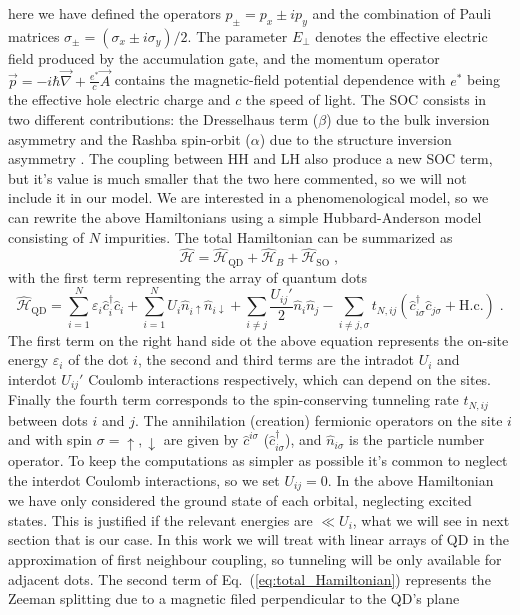 here we have defined the operators $p_\pm=p_x\pm ip_y$ and the combination of Pauli matrices $\sigma_{\pm}=(\sigma_x\pm i\sigma_y)/2$. The parameter $E_\perp$ denotes the effective electric field produced by the accumulation gate, and the momentum operator $\vec{p}=-i\hbar\vec{\nabla}+\frac{e^*}{c}\vec{A}$ contains the magnetic-field potential dependence with $e^*$ being the effective hole electric charge and $c$ the speed of light. The SOC consists in two different contributions: the Dresselhaus term ($\beta$) due to the bulk inversion asymmetry \cite{Dresselhaus1955} and the Rashba spin-orbit ($\alpha$) due to the structure inversion asymmetry \cite{Bychkov1984}. The coupling between HH and LH also produce a new SOC term\cite{Bulaev2007}, but it's value is much smaller that the two here commented, so we will not include it in our model. We are interested in a phenomenological model, so we can rewrite the above Hamiltonians using a simple Hubbard-Anderson \cite{1963a,Anderson1961,Traa1994} model consisting of $N$ impurities. The total Hamiltonian can be summarized as
\begin{equation}
	\hat{\mathcal{H}}=\hat{\mathcal{H}}_{\text{QD}}+\hat{\mathcal{H}}_B+\hat{\mathcal{H}}_{\text{SO}}\; ,
	\label{eq:total_Hamiltonian}
\end{equation}
with the first term representing the array of quantum dots
\begin{equation}
	\hat{\mathcal{H}}_{\text{QD}}=\sum_{i=1}^N\varepsilon_{i}\hat{c}^\dagger_i\hat{c}_i+\sum_{i=1}^NU_i\hat{n}_{i\uparrow}\hat{n}_{i\downarrow}+\sum_{i\neq j}\frac{U_{ij}'}{2}\hat{n}_i\hat{n}_j-\sum_{i\neq j,\sigma}t_{N,ij}(\hat{c}^\dagger_{i\sigma}\hat{c}_{j\sigma}+ \text{H.c.})\; .
\end{equation}
The first term on the right hand side ot the above equation represents the on-site energy $\varepsilon_{i}$ of the dot $i$, the second and third terms are the intradot $U_i$ and interdot $U_{ij}'$ Coulomb interactions respectively, which can depend on the sites. Finally the fourth term corresponds to the spin-conserving tunneling rate $t_{N,ij}$ between dots $i$ and $j$. The annihilation (creation) fermionic operators on the site $i$ and with spin $\sigma=\uparrow,\downarrow$ are given by $\hat{c}^{i\sigma}$ ($\hat{c}_{i\sigma}^\dagger$), and $\hat{n}_{i\sigma}$ is the particle number operator. To keep the computations as simpler as possible it's common to neglect the interdot Coulomb interactions, so we set $U_{ij}=0$. In the above Hamiltonian we have only considered the ground state of each orbital, neglecting excited states. This is justified if the relevant energies are $\ll U_i$, what we will see in next section that is our case. In this work we will treat with linear arrays of QD in the approximation of first neighbour coupling, so tunneling will be only available for adjacent dots. The second term of Eq.~(\ref{eq:total_Hamiltonian}) represents the Zeeman splitting due to a magnetic filed perpendicular to the QD's plane
